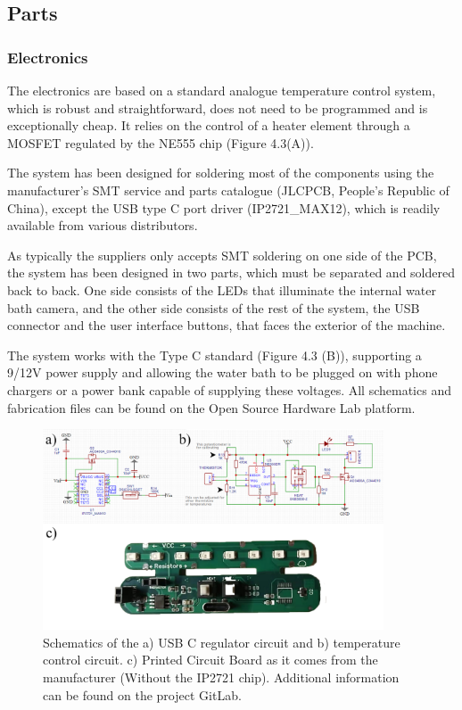 \subsection{Parts}
\subsubsection{Electronics}
The electronics are based on a standard analogue temperature control system, which is robust and straightforward, does not need to be programmed and is exceptionally cheap. It relies on the control of a heater element through a MOSFET regulated by the NE555 chip (Figure 4.3(A)).

The system has been designed for soldering most of the components using the manufacturer's SMT service and parts catalogue (JLCPCB, People's Republic of China), except the USB type C port driver (IP2721\_MAX12), which is readily available from various distributors.

As typically the suppliers only accepts SMT soldering on one side of the PCB, the system has been designed in two parts, which must be separated and soldered back to back. One side consists of the LEDs that illuminate the internal water bath camera, and the other side consists of the rest of the system, the USB connector and the user interface buttons, that faces the exterior of the machine.

The system works with the Type C standard (Figure 4.3 (B)), supporting a 9/12V power supply and allowing the water bath to be plugged on with phone chargers or a power bank capable of supplying these voltages. All schematics and fabrication files can be found on the Open Source Hardware Lab platform\cite{francisco_javier_quero_lombardero_lamp_2021}.

 \begin{figure}[b]
    \centering
    \includegraphics[width=0.9\textwidth]{figures/electronica.png}
    \caption{Schematics of the a) USB C regulator circuit and b) temperature control circuit. c) Printed Circuit Board as it comes from the manufacturer (Without the IP2721 chip). Additional information can be found on the project GitLab\cite{francisco_javier_quero_lombardero_open_2021}.}
    \label{Schematics Water Bath}
\end{figure}

